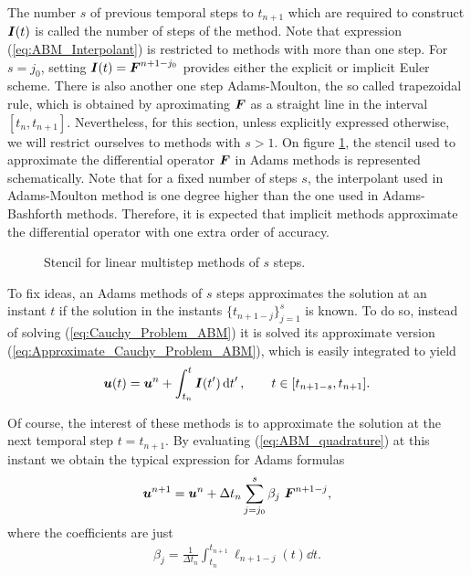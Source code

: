 The number $s$ of previous temporal steps to $t_{n+1}$ which are required to construct $\boldsymbol{I}(t)$ is called the number of steps of the method. Note that expression (\ref{eq:ABM_Interpolant}) is restricted to methods with more than one step. For $s=j_0$, setting $\boldsymbol{I}(t)=\boldsymbol{F}^{n+1-j_0}$ provides either the explicit or implicit Euler scheme. There is also another one step Adams-Moulton, the so called trapezoidal rule, which is obtained by aproximating $\boldsymbol{F}$ as a straight line in the interval $[t_n,t_{n+1}]$. Nevertheless, for this section, unless explicitly expressed otherwise, we will restrict ourselves to methods with $s>1$. On figure \ref{fig:ABM_Stencil}, the stencil used to approximate the differential operator $\boldsymbol{F}$ in Adams methods is represented schematically. Note that for a fixed number of steps $s$, the interpolant used in Adams-Moulton method is one degree higher than the one used in Adams-Bashforth methods. Therefore, it is expected that implicit methods approximate the differential operator with one extra order of accuracy. 
\FloatBarrier
\begin{figure}[h]
	\ABMStencil{}
	\caption{Stencil for linear multistep methods of $s$ steps.}
	\label{fig:ABM_Stencil}
\end{figure}


\FloatBarrier
To fix ideas, an Adams methods of $s$ steps approximates the solution at an instant $t$ if the solution in the instants $\{t_{n+1-j}\}_{j=1}^{s}$ is known. To do so, instead of solving (\ref{eq:Cauchy_Problem_ABM}) it is solved its approximate version (\ref{eq:Approximate_Cauchy_Problem_ABM}), which is easily integrated to yield
%
\begin{align}
	\boldsymbol{u}(t) 
	=
	\boldsymbol{u}^n
	+
	\int_{t_n}^{t}
	\boldsymbol{I}(t')\dd{ t'},
	\qquad
	t\in [t_{n+1-s},t_{n+1}].
	\label{eq:ABM_quadrature}
\end{align}

Of course, the interest of these methods is to approximate the solution at the next temporal step $t=t_{n+1}$. By evaluating (\ref{eq:ABM_quadrature}) at this instant we obtain the typical expression for Adams formulas
%
\begin{align}
	\boldsymbol{u}^{n+1} =
	\boldsymbol{u}^n
	+
	\Delta t_n
	\sum_{j=j_0}^{s}
	\beta_{j}\ \boldsymbol{F}^{n+1-j}
	,
	\label{eq:ABM_methods}
\end{align}
where the coefficients are just
%
\begin{align}
	\beta_{j} 
	=
	\frac{1}{\Delta t_n}
	\int_{t_n}^{t_{n+1}}\ell_{n+1-j}(t) \dd{t}.
	\label{eq:ABM_beta}
\end{align}

